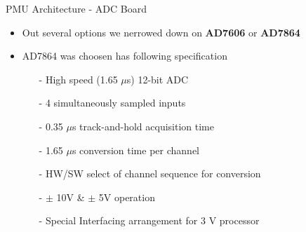\documentclass{beamer}
\begin{document}
\begin{frame}{PMU Architecture - ADC Board}

\begin{itemize}
\item Out several options we nerrowed down on \textbf{AD7606} or \textbf{AD7864}
\item AD7864 was choosen has following specification
\begin{itemize}
	\item[-] High speed (1.65 $\mu$s) 12-bit ADC 
	\item[-] 4 simultaneously sampled inputs
	\item[-] 0.35 $\mu$s track-and-hold acquisition time 
	\item[-] 1.65 $\mu$s conversion time per channel 
	\item[-] HW/SW select of channel sequence for conversion 
	\item[-] $\pm$ 10V \& $\pm$ 5V operation
	\item[-] Special Interfacing arrangement for 3 V processor 
\end{itemize} 
\end{itemize}
\end{frame}
\end{document}
